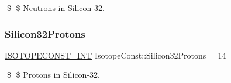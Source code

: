\$ \$ Neutrons in Silicon-\/32. \mbox{\label{group___isotope_const-_silicon-_si32_ga0183e7fc8a1079c0e8dd019065cbc2f5}} 
\subsubsection{\texorpdfstring{Silicon32\+Protons}{Silicon32Protons}}
{\footnotesize\ttfamily \mbox{\hyperlink{group___isotope_const-_macros_ga5f18360b3e99483a35c32d789e62621c}{I\+S\+O\+T\+O\+P\+E\+C\+O\+N\+S\+T\+\_\+\+I\+NT}} Isotope\+Const\+::\+Silicon32\+Protons = 14}

\$ \$ Protons in Silicon-\/32. 